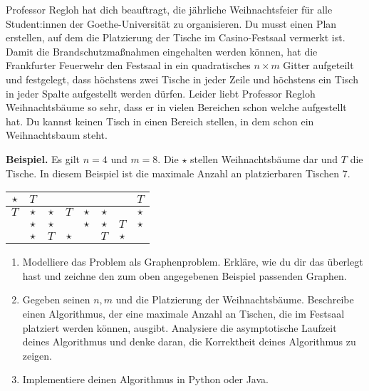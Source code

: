 \documentclass{uebung_cs}
\begin{document}
\begin{aufgabe}[Weihnachtsbäume]
    Professor Regloh hat dich beauftragt, die jährliche Weihnachtsfeier für alle Student:innen der Goethe-Universität zu organisieren. Du musst einen Plan erstellen, auf dem die Platzierung der Tische im Casino-Festsaal vermerkt ist. Damit die Brandschutzmaßnahmen eingehalten werden können, hat die Frankfurter Feuerwehr den Festsaal in ein quadratisches $n \times m$ Gitter aufgeteilt und festgelegt, dass höchstens zwei Tische in jeder Zeile und höchstens ein Tisch in jeder Spalte aufgestellt werden dürfen. Leider liebt Professor Regloh Weihnachtsbäume so sehr, dass er in vielen Bereichen schon welche aufgestellt hat. Du kannst keinen Tisch in einen Bereich stellen, in dem schon ein Weihnachtsbaum steht.
    
    \textbf{Beispiel.} Es gilt $n = 4$ und $m = 8$. Die $\star$ stellen Weihnachtsbäume dar und $T$ die Tische. In diesem Beispiel ist die maximale Anzahl an platzierbaren Tischen 7.
    
    \vspace{4mm}
    \begin{center}
    \begin{tabular}{|c|c|c|c|c|c|c|c|}
    \hline 
    \rule[-1ex]{0pt}{2.5ex} $\star$ & $T$ &  &  &  &  &  & $T$ \\ 
    \hline 
    \rule[-1ex]{0pt}{2.5ex} $T$ & $\star$ & $\star$ & $T$ & $\star$ & $\star$ &  & $\star$ \\ 
    \hline 
    \rule[-1ex]{0pt}{2.5ex}  & $\star$ & $\star$ &  & $\star$ & $\star$ & $T$ & $\star$ \\ 
    \hline 
    \rule[-1ex]{0pt}{2.5ex}  & $\star$ & $T$ & $\star$ &  & $T$ & $\star$ &  \\ 
    \hline 
    \end{tabular} 
    \end{center}
    \vspace{4mm}
    \begin{enumerate}
    	\item Modelliere das Problem als Graphenproblem. Erkläre, wie du dir das überlegt hast und zeichne den zum oben angegebenen Beispiel passenden Graphen.\\
    	\item Gegeben seinen $n,m$ und die Platzierung der Weihnachtsbäume. Beschreibe einen Algorithmus, der eine maximale Anzahl an Tischen, die im Festsaal platziert werden können, ausgibt. Analysiere die asymptotische Laufzeit deines Algorithmus und denke daran, die Korrektheit deines Algorithmus zu zeigen.\\
    	\item Implementiere deinen Algorithmus in Python oder Java.
    \end{enumerate}
\end{aufgabe}
\end{document}
